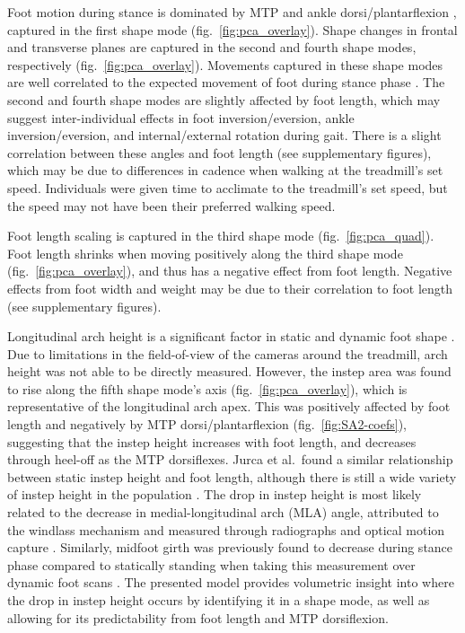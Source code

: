 \documentclass[defaultstyle,11pt]{comps}
\begin{document}
Foot motion during stance is dominated by MTP and ankle dorsi/plantarflexion \citep{Leardini2007}, captured in the first shape mode (fig.~\ref{fig:pca_overlay}).
Shape changes in frontal and transverse planes are captured in the second and fourth shape modes, respectively (fig.~\ref{fig:pca_overlay}).
Movements captured in these shape modes are well correlated to the expected movement of foot during stance phase \citep{Leardini2007}.
The second and fourth shape modes are slightly affected by foot length, which may suggest inter-individual effects in foot inversion/eversion, ankle inversion/eversion, and internal/external rotation during gait.
There is a slight correlation between these angles and foot length (see supplementary figures), which may be due to differences in cadence when walking at the treadmill's set speed.
Individuals were given time to acclimate to the treadmill's set speed, but the speed may not have been their preferred walking speed.

Foot length scaling is captured in the third shape mode (fig.~\ref{fig:pca_quad}).
Foot length shrinks when moving positively along the third shape mode (fig.~\ref{fig:pca_overlay}), and thus has a negative effect from foot length.
Negative effects from foot width and weight may be due to their correlation to foot length (see supplementary figures).

Longitudinal arch height is a significant factor in static \citep{Stankovic2020, Conrad2019} and dynamic foot shape \citep{Schuster2021} .
Due to limitations in the field-of-view of the cameras around the treadmill, arch height was not able to be directly measured.
However, the instep area was found to rise along the fifth shape mode's axis (fig.~\ref{fig:pca_overlay}), which is representative of the longitudinal arch apex.
This was positively affected by foot length and negatively by MTP dorsi/plantarflexion (fig.~\ref{fig:SA2-coefs}), suggesting that the instep height increases with foot length, and decreases through heel-off as the MTP dorsiflexes.
Jurca et al.~found a similar relationship between static instep height and foot length, although there is still a wide variety of instep height in the population \citep{Jurca2019}.
The drop in instep height is most likely related to the decrease in medial-longitudinal arch (MLA) angle, attributed to the windlass mechanism and measured through radiographs and optical motion capture \citep{Hicks1954, Caravaggi2010, Stolwijk2014}.
Similarly, midfoot girth was previously found to decrease during stance phase compared to statically standing when taking this measurement over dynamic foot scans \citep{Grau2018}.
The presented model provides volumetric insight into where the drop in instep height occurs by identifying it in a shape mode, as well as allowing for its predictability from foot length and MTP dorsiflexion.
\end{document}
